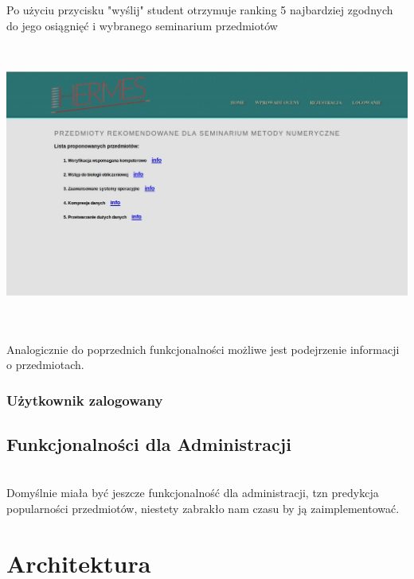 \documentclass[licencjacka]{pracamgr}
\begin{document}
Po użyciu przycisku "wyślij" student otrzymuje ranking 5 najbardziej zgodnych do jego osiągnięć i wybranego seminarium przedmiotów \par
~\\
\begin{minipage}{\linewidth}
	\centering
           \includegraphics[scale=0.5]{rekPrzedmSemResult.jpg}
\end{minipage} \\ ~\\
\newpage
Analogicznie do poprzednich funkcjonalności możliwe jest podejrzenie informacji o przedmiotach.

\subsection{Użytkownik zalogowany}

\section{Funkcjonalności dla Administracji}
~\\ \indent
Domyślnie miała być jeszcze funkcjonalność dla administracji, tzn predykcja popularności przedmiotów, niestety zabrakło nam czasu by ją zaimplementować.
 

 \chapter{Architektura} 
\end{document}
